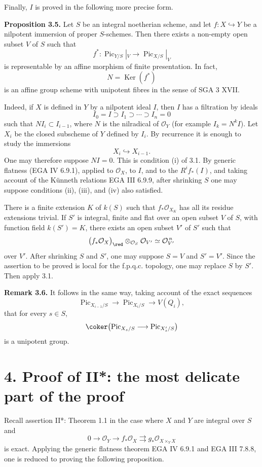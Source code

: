 \documentclass[11pt]{article}
\providecommand{\Pic}{\operatorname{Pic}}
\providecommand{\Ker}{\operatorname{Ker}}
\begin{document}
Finally, \(I\) is proved in the following more precise form.

\textbf{Proposition 3.5.} Let \(S\) be an integral noetherian scheme, and let \(f:X\hookrightarrow Y\) be a nilpotent immersion of proper \(S\)-schemes. Then there exists a non-empty open subset \(V\) of \(S\) such that
\[
  f^*:\Pic_{Y/S}|_V\longrightarrow \Pic_{X/S}|_V
\]
is representable by an affine morphism of finite presentation. In fact,
\[
  N=\Ker(f^*)
\]
is an affine group scheme with unipotent fibres in the sense of SGA 3 XVII.

Indeed, if \(X\) is defined in \(Y\) by a nilpotent ideal \(I\), then \(I\) has a filtration by ideals
\[
  I_0=I\supset I_1\supset\cdots\supset I_n=0
\]
such that \(NI_i\subset I_{i-1}\), where \(N\) is the nilradical of \(\mathcal O_Y\) (for example \(I_k=N^kI\)). Let \(X_i\) be the closed subscheme of \(Y\) defined by \(I_i\). By recurrence it is enough to study the immersions
\[
  X_i\hookrightarrow X_{i-1}.
\]
One may therefore suppose \(NI=0\). This is condition (i) of 3.1. By generic flatness (EGA IV 6.9.1), applied to \(\mathcal O_X\), to \(I\), and to the \(R^if_*(I)\), and taking account of the Künneth relations EGA III 6.9.9, after shrinking \(S\) one may suppose conditions (ii), (iii), and (iv) also satisfied.

There is a finite extension \(K\) of \(k(S)\) such that \(f_*\mathcal O_{X_K}\) has all its residue extensions trivial. If \(S'\) is integral, finite and flat over an open subset \(V\) of \(S\), with function field \(k(S')=K\), there exists an open subset \(V'\) of \(S'\) such that
\[
  \bigl(f_*\mathcal O_X\bigr)_{\red}\otimes_{\mathcal O_S}\mathcal O_{V'}
  \simeq \mathcal O_{V'}^{\,n}
\]
over \(V'\). After shrinking \(S\) and \(S'\), one may suppose \(S=V\) and \(S'=V'\). Since the assertion to be proved is local for the f.p.q.c. topology, one may replace \(S\) by \(S'\). Then apply 3.1.

\textbf{Remark 3.6.} It follows in the same way, taking account of the exact sequences
\[
  \Pic_{X_{i-1}/S}\longrightarrow \Pic_{X_i/S}\longrightarrow V(Q_i),
\]
that for every \(s\in S\),
\[
  \coker\bigl(\Pic_{X_s/S}\longrightarrow\Pic_{X'_s/S}\bigr)
\]
is a unipotent group.

\section*{4. Proof of II*: the most delicate part of the proof}

Recall assertion II*: Theorem 1.1 in the case where \(X\) and \(Y\) are integral over \(S\) and
\[
  0\longrightarrow \mathcal O_Y\longrightarrow f_*\mathcal O_X
  \rightrightarrows g_*\mathcal O_{X\times_YX}
\]
is exact. Applying the generic flatness theorem EGA IV 6.9.1 and EGA III 7.8.8, one is reduced to proving the following proposition.
\end{document}
